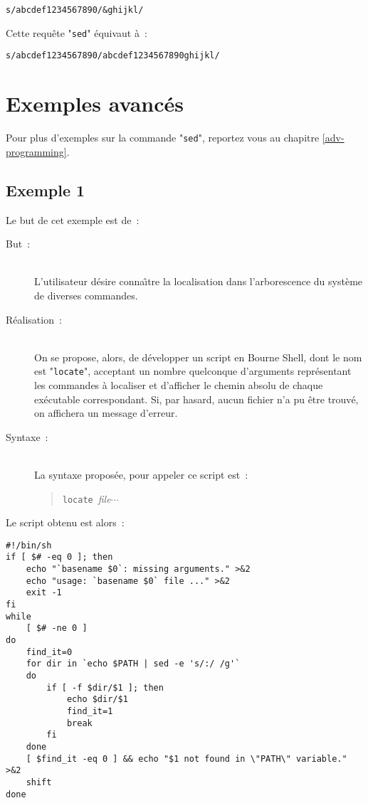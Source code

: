\begin{example}
\begin{verbatim}
s/abcdef1234567890/&ghijkl/
\end{verbatim}

Cette requ{\^e}te "{\tt sed}" {\'e}quivaut {\`a}~:
\begin{verbatim}
s/abcdef1234567890/abcdef1234567890ghijkl/
\end{verbatim}
\end{example}

\section{Exemples avanc{\'e}s}

Pour plus d'exemples sur la commande "{\tt sed}", reportez vous au
chapitre \ref{adv-programming}.


\subsection{\label{adv-fltrs-sed-ex1}Exemple 1}

Le but de cet exemple est de~:
\begin{description}
	\item[But~:]\mbox{}\\
		L'utilisateur d{\'e}sire conna{\^\i}tre la localisation dans l'arborescence du
		syst{\`e}me de diverses commandes.\\[2ex]
	\item[R{\'e}alisation~:]\mbox{}\\
		On se propose, alors, de d{\'e}velopper un script en Bourne Shell, dont le nom est
		"{\tt locate}", acceptant un nombre quelconque d'arguments
		repr{\'e}sentant les commandes {\`a} localiser et d'afficher le chemin absolu de
		chaque ex{\'e}cutable correspondant. Si, par hasard, aucun fichier n'a pu {\^e}tre
		trouv{\'e}, on affichera un message d'erreur.\\[2ex]
	\item[Syntaxe~:]\mbox{}\\
		La syntaxe propos{\'e}e, pour appeler ce script est~:
		\begin{quote}
		{\tt locate}~{\sl file}$\cdots$
		\end{quote}
\end{description}

Le script obtenu est alors~:
\begin{verbatim}
#!/bin/sh
if [ $# -eq 0 ]; then
    echo "`basename $0`: missing arguments." >&2
    echo "usage: `basename $0` file ..." >&2
    exit -1
fi
while
    [ $# -ne 0 ]
do
    find_it=0
    for dir in `echo $PATH | sed -e 's/:/ /g'`
    do
        if [ -f $dir/$1 ]; then
            echo $dir/$1
            find_it=1
            break
        fi
    done
    [ $find_it -eq 0 ] && echo "$1 not found in \"PATH\" variable." >&2
    shift
done
\end{verbatim}

